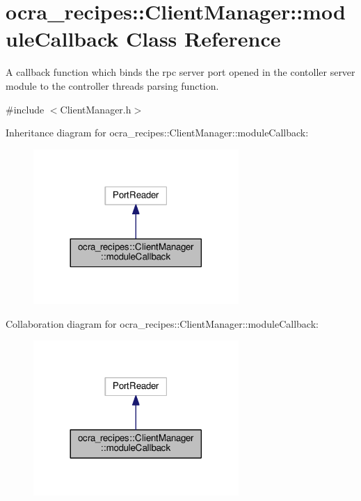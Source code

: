 \hypertarget{classocra__recipes_1_1ClientManager_1_1moduleCallback}{}\section{ocra\+\_\+recipes\+:\+:Client\+Manager\+:\+:module\+Callback Class Reference}
\label{classocra__recipes_1_1ClientManager_1_1moduleCallback}


A callback function which binds the rpc server port opened in the contoller server module to the controller thread\textquotesingle{}s parsing function.  




{\ttfamily \#include $<$Client\+Manager.\+h$>$}



Inheritance diagram for ocra\+\_\+recipes\+:\+:Client\+Manager\+:\+:module\+Callback\+:
\nopagebreak
\begin{figure}[H]
\begin{center}
\leavevmode
\includegraphics[width=221pt]{dd/d37/classocra__recipes_1_1ClientManager_1_1moduleCallback__inherit__graph}
\end{center}
\end{figure}


Collaboration diagram for ocra\+\_\+recipes\+:\+:Client\+Manager\+:\+:module\+Callback\+:
\nopagebreak
\begin{figure}[H]
\begin{center}
\leavevmode
\includegraphics[width=221pt]{dd/d3d/classocra__recipes_1_1ClientManager_1_1moduleCallback__coll__graph}
\end{center}
\end{figure}

